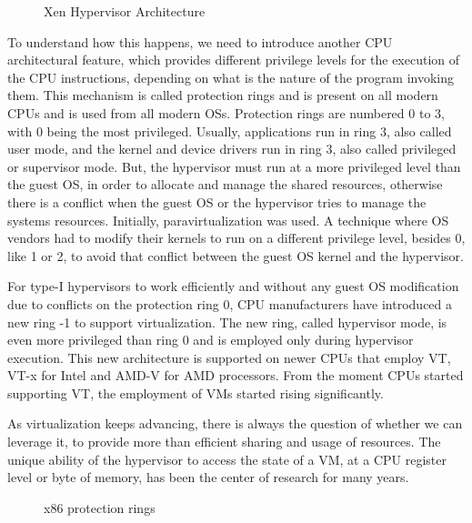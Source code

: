 \begin{figure}
	\centering
	
	\caption{Xen Hypervisor Architecture}
	\label{img:xen}
\end{figure}

\par To understand how this happens, we need to introduce another \ac{CPU} architectural feature, which provides different privilege levels for the execution of the \ac{CPU} instructions, depending on what is the nature of the program invoking them. This mechanism is called protection rings and is present on all modern \ac{CPU}s and is used from all modern \ac{OS}s. Protection rings are numbered 0 to 3, with 0 being the most privileged. Usually, applications run in ring 3, also called user mode, and the kernel and device drivers run in ring 3, also called privileged or supervisor mode. But, the hypervisor must run at a more privileged level than the guest \ac{OS}, in order to allocate and manage the shared resources, otherwise there is a conflict when the guest \ac{OS} or the hypervisor tries to manage the systems resources. Initially, paravirtualization was used. A technique where \ac{OS} vendors had to modify their kernels to run on a different privilege level, besides 0, like 1 or 2, to avoid that conflict between the guest \ac{OS} kernel and the hypervisor.

\par For type-I hypervisors to work efficiently and without any guest \ac{OS} modification due to conflicts on the protection ring 0, \ac{CPU} manufacturers have introduced a new ring -1 to support virtualization. The new ring, called hypervisor mode, is even more privileged than ring 0 and is employed only during hypervisor execution. This new architecture is supported on newer \ac{CPU}s that employ \ac{VT}, VT-x for Intel and AMD-V for AMD processors. From the moment \ac{CPU}s started supporting \ac{VT}, the employment of \ac{VM}s started rising significantly.

As virtualization keeps advancing, there is always the question of whether we can leverage it, to provide more than efficient sharing and usage of resources. The unique ability of the hypervisor to access the state of a \ac{VM}, at a \ac{CPU} register level or byte of memory, has been the center of research for many years. 

\begin{figure}
	\centering
	
	\caption{x86 protection rings}
	\label{fig:rings}
\end{figure}

